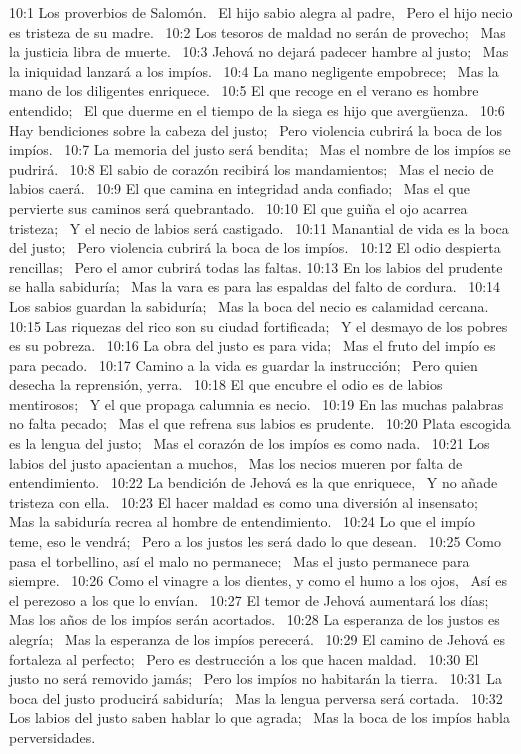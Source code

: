 10:1 Los proverbios de Salomón.  
El hijo sabio alegra al padre,  
Pero el hijo necio es tristeza de su madre.  
10:2 Los tesoros de maldad no serán de provecho;  
Mas la justicia libra de muerte.  
10:3 Jehová no dejará padecer hambre al justo;  
Mas la iniquidad lanzará a los impíos.  
10:4 La mano negligente empobrece;  
Mas la mano de los diligentes enriquece.  
10:5 El que recoge en el verano es hombre entendido;  
El que duerme en el tiempo de la siega es hijo que avergüenza.  
10:6 Hay bendiciones sobre la cabeza del justo;  
Pero violencia cubrirá la boca de los impíos.  
10:7 La memoria del justo será bendita;  
Mas el nombre de los impíos se pudrirá.  
10:8 El sabio de corazón recibirá los mandamientos;  
Mas el necio de labios caerá.  
10:9 El que camina en integridad anda confiado;  
Mas el que pervierte sus caminos será quebrantado.  
10:10 El que guiña el ojo acarrea tristeza;  
Y el necio de labios será castigado.  
10:11 Manantial de vida es la boca del justo;  
Pero violencia cubrirá la boca de los impíos.  
10:12 El odio despierta rencillas;  
Pero el amor cubrirá todas las faltas. 
10:13 En los labios del prudente se halla sabiduría;  
Mas la vara es para las espaldas del falto de cordura.  
10:14 Los sabios guardan la sabiduría;  
Mas la boca del necio es calamidad cercana.  
10:15 Las riquezas del rico son su ciudad fortificada;  
Y el desmayo de los pobres es su pobreza.  
10:16 La obra del justo es para vida;  
Mas el fruto del impío es para pecado.  
10:17 Camino a la vida es guardar la instrucción;  
Pero quien desecha la reprensión, yerra.  
10:18 El que encubre el odio es de labios mentirosos;  
Y el que propaga calumnia es necio.  
10:19 En las muchas palabras no falta pecado;  
Mas el que refrena sus labios es prudente.  
10:20 Plata escogida es la lengua del justo;  
Mas el corazón de los impíos es como nada.  
10:21 Los labios del justo apacientan a muchos,  
Mas los necios mueren por falta de entendimiento.  
10:22 La bendición de Jehová es la que enriquece,  
Y no añade tristeza con ella.  
10:23 El hacer maldad es como una diversión al insensato;  
Mas la sabiduría recrea al hombre de entendimiento.  
10:24 Lo que el impío teme, eso le vendrá;  
Pero a los justos les será dado lo que desean.  
10:25 Como pasa el torbellino, así el malo no permanece;  
Mas el justo permanece para siempre.  
10:26 Como el vinagre a los dientes, y como el humo a los ojos,  
Así es el perezoso a los que lo envían.  
10:27 El temor de Jehová aumentará los días;  
Mas los años de los impíos serán acortados.  
10:28 La esperanza de los justos es alegría;  
Mas la esperanza de los impíos perecerá.  
10:29 El camino de Jehová es fortaleza al perfecto;  
Pero es destrucción a los que hacen maldad.  
10:30 El justo no será removido jamás;  
Pero los impíos no habitarán la tierra.  
10:31 La boca del justo producirá sabiduría;  
Mas la lengua perversa será cortada.  
10:32 Los labios del justo saben hablar lo que agrada;  
Mas la boca de los impíos habla perversidades.  
